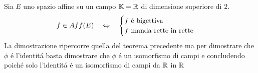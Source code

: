 \spazio
\begin{thm}Sia $E$ uno spazio affine su un campo $\mathbb{K}=\mathbb{R}$ di dimensione superiore di $2$.
$$ f\in Aff(E) \quad \Leftrightarrow \quad \begin{cases} f \text{ \'e bigettiva} \\
f \text{ manda rette in rette } \end{cases}$$
\proof
La dimostrazione ripercorre quella del teorema precedente ma per dimostrare che $\phi$ \'e l'identit\'a basta dimostrare che $\phi$ \'e un isomorfismo di campi e concludendo poich\'e solo l'identit\'a \'e un isomorfismo di campi da $\mathbb{R}$ in $\mathbb{R}$
\endproof
\end{thm}
%
